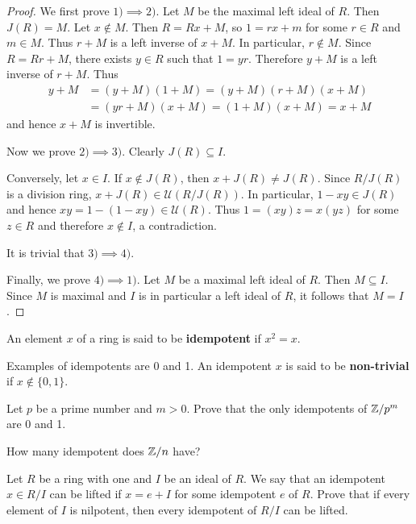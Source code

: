 \begin{proof}
    We first prove $1)\implies2)$. Let $M$ be the maximal left ideal of $R$. Then $J(R)=M$. 
    Let $x\not\in M$. Then $R=Rx+M$, so $1=rx+m$ for some $r\in R$ and $m\in M$. Thus  
    $r+M$ is a left inverse of $x+M$. In particular, 
    $r\not\in M$. Since $R=Rr+M$, there exists $y\in R$ such that $1=yr$. Therefore
    $y+M$ is a left inverse of $r+M$. Thus 
    \begin{align*}
    y+M&=(y+M)(1+M)=(y+M)(r+M)(x+M)\\
    &=(yr+M)(x+M)=(1+M)(x+M)=x+M
    \end{align*}
    and hence $x+M$ is invertible. 

    Now we prove $2)\implies3)$. Clearly $J(R)\subseteq I$. 
    
    Conversely, let $x\in I$. If $x\not\in J(R)$, then
    $x+J(R)\ne J(R)$. Since $R/J(R)$ is a division ring, 
    $x+J(R)\in\mathcal{U}(R/J(R))$. In particular, $1-xy\in J(R)$ and hence 
    $xy=1-(1-xy)\in\mathcal{U}(R)$. Thus $1=(xy)z=x(yz)$ for some $z\in R$ and therefore $x\not\in I$, a contradiction. 
    
    It is trivial that $3)\implies4)$. 

    Finally, we prove $4)\implies 1)$. 
    Let $M$ be a maximal left ideal of $R$. Then $M\subseteq I$. Since $M$ 
    is maximal and $I$ is in particular a left ideal of $R$, 
    it follows that $M=I$. 
\end{proof}

\begin{definition}
    An element $x$ of a ring is said to be \textbf{idempotent} 
    if $x^2=x$.   
\end{definition}

Examples of idempotents are 0 and 1. 
An idempotent $x$ is said to be \textbf{non-trivial} if $x\not\in\{0,1\}$. 

\begin{exercise}
\label{xca:idempotents_modpm}
    Let $p$ be a prime number and $m>0$. 
    Prove that the only idempotents of $\mathbb{Z}/p^m$ are 0 and 1. 
\end{exercise}


\begin{exercise}
    \label{xca:idempotents_modn}
    How many idempotent does $\mathbb{Z}/n$ have?
\end{exercise}

\begin{exercise}
\label{xca:lifting_idempotents}
    Let $R$ be a ring with one and $I$ be an ideal of $R$. 
    We say that an idempotent $x\in R/I$ can be lifted if $x=e+I$ for
    some idempotent $e$ of $R$. 
    Prove that if every element of $I$ is nilpotent, then every 
    idempotent of $R/I$ can be lifted. 
\end{exercise}

